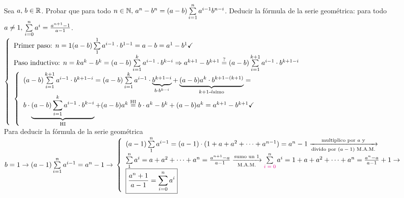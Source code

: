 \documentclass[12pt,a4paper, spanish]{article}
\begin{document}
\ejercicio
Sea $a,\, b \in \mathbb R$. Probar que para todo $n \in \mathbb N,\, a^n - b^n = (a-b) \sum\limits_{i = 1}^{n}a^{i-1}b^{n-i}$. Deducir la fórmula de la serie
geométrica: para todo $a \neq 1,\, \sum\limits_{i = 0}^{n}a^i = \frac{a^{n+1} - 1}{a-1}$.\\
$\llave{ l }{
		\text{Primer paso: } n = 1 (a-b) \sumatoria{1}{1} a^{i-1} \cdot b^{1-1} = a - b = a^1 - b^1 \checkmark\\
		\text{Paso inductivo: } n = k  a^k - b^k = (a-b) \sumatoria{i = 1}{k} a^{i-1} \cdot b^{k-i} \entonces
		a^{k+1} - b^{k+1} \eq?= (a-b) \sumatoria{i = 1}{k+1} a^{i-1} \cdot b^{k+1-i}\\
		\llave{l}{
			(a-b) \sumatoria{i = 1}{k+1} a^{i-1} \cdot b^{k+1-i} =
			(a-b) \sumatoria{i = 1}{k} a^{i-1} \cdot \underbrace{b^{k+1-i}}_{b\cdot b^{k-i}} +
			\kmasuno{
				(a - b) a^k \cdot b^{k+1-(k+1)}
			} = \\
			b \cdot
			\HI{
				(a-b) \sumatoria{i = 1}{k} a^{i-1} \cdot b^{k-i}
			} + (a - b) a^k \eqHI= b \cdot a^k - b^k + (a - b) a^k = a^{k+1} - b^{k+1}\checkmark
		}\\
	}$\\
Para deducir la fórmula de la serie geométrica $b = 1 \to (a-1) \sumatoria{i=1}{n} a^{i-1} = a^n - 1 \to\\
	\llave{ l }{
		(a-1) \sumatoria{1}{n} a^{i-1} =(a-1) \cdot (1 + a + a^2 + \cdots + a^{n-1})  = a^n - 1 \flecha{multiplico por $a$ y}[divido por $(a - 1)$ M.A.M.]\\
		\sumatoria{1}{n} a^i = a + a^2 + \cdots + a^n  = \frac{a^{n+1} - a}{a-1} \flecha{sumo un $1$}[M.A.M.]
		\sumatoria{\magenta{$i = 0$}}{n} a^i = 1 + a + a^2 + \cdots + a^n   = \frac{a^n - a}{a-1} + 1 \to\\
		\boxed{ \frac{a^n + 1}{a-1} =  \sumatoria{i = 0}{n} a^i  }
	}$

\ejercicio

\ejercicio

\ejercicio

\ejercicio

\ejercicio
\end{document}
